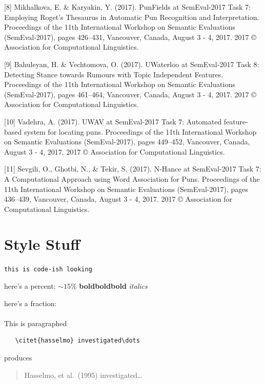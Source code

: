 \documentclass{article}
\begin{document}
[8] Mikhalkova, E. \& Karyakin, Y. (2017). PunFields at SemEval-2017 Task 7:
Employing Roget’s Thesaurus in Automatic Pun Recognition and Interpretation.
Proceedings of the 11th International Workshop on Semantic Evaluations
(SemEval-2017), pages 426–431, Vancouver, Canada, August 3 - 4, 2017. 2017 ©
Association for Computational Linguistics.

[9] Bahuleyan, H. \& Vechtomova, O. (2017). UWaterloo at SemEval-2017 Task 8:
Detecting Stance towards Rumours with Topic Independent Features. Proceedings
of the 11th International Workshop on Semantic Evaluations (SemEval-2017),
pages 461–464, Vancouver, Canada, August 3 - 4, 2017. 2017 © Association for
Computational Linguistics.

[10] Vadehra, A. (2017). UWAV at SemEval-2017 Task 7: Automated feature-based
system for locating puns. Proceedings of the 11th International Workshop on
Semantic Evaluations (SemEval-2017), pages 449–452, Vancouver, Canada, August 3
- 4, 2017. 2017 © Association for Computational Linguistics.

[11] Sevgili, O., Ghotbi, N., \& Tekir, S. (2017). N-Hance at SemEval-2017 Task
7: A Computational Approach using Word Association for Puns. Proceedings of the
11th International Workshop on Semantic Evaluations (SemEval-2017), pages
436–439, Vancouver, Canada, August 3 - 4, 2017. 2017 © Association for
Computational Linguistics.

\section{Style Stuff}
\verb+this is code-ish looking+ 

here's a percent: $\sim$$15\%$
\textbf{boldboldbold}
\emph{italics}

here's a fraction: 

\paragraph{}This is paragraphed
\begin{verbatim}
   \citet{hasselmo} investigated\dots
\end{verbatim}
produces
\begin{quote}
  Hasselmo, et al.\ (1995) investigated\dots
\end{quote}
\end{document}
